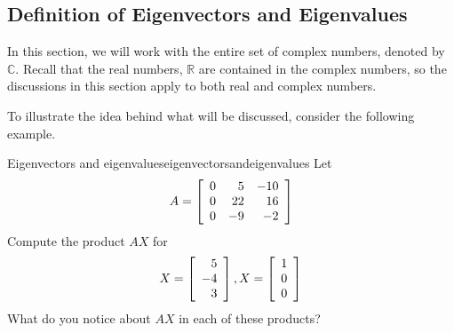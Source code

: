 \subsection{Definition of Eigenvectors and Eigenvalues}

In this section, we will work with the entire set of complex numbers, 
denoted by $\mathbb{C}$. Recall that the real numbers, $\mathbb{R}$ are 
contained in the complex numbers, so the discussions in this section 
apply to both real and complex numbers. 

To illustrate the idea behind what will be discussed, consider the following
example.

\begin{example}{Eigenvectors and eigenvalues}{eigenvectorsandeigenvalues}
Let
\begin{equation*}
A = \left[
\begin{array}{rrr}
0 & 5 & -10 \\
0 & 22 & 16 \\
0 & -9 & -2
\end{array}
\right] 
\end{equation*}
Compute the product $AX$ for 
\begin{equation*}
X = \left[
\begin{array}{r}
5 \\
-4 \\
 3
\end{array}
\right], X = \left[
\begin{array}{r}
1 \\
0 \\
0
\end{array}
\right]
\end{equation*}
What do you notice about $AX$ in each of these products? 
\end{example}

